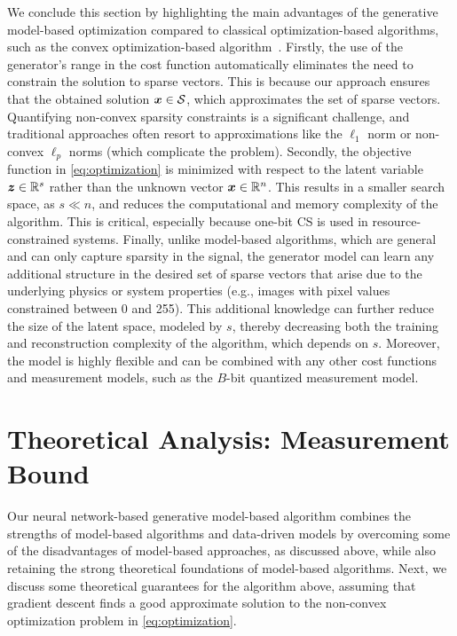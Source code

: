 \documentclass[journal]{IEEEtran}
\begin{document}
We conclude this section by highlighting the main advantages of the generative model-based optimization compared to classical optimization-based algorithms, such as the convex optimization-based algorithm~\cite{plan2012robust}. Firstly, the use of the generator's range in the cost function automatically eliminates the need to constrain the solution to sparse vectors. This is because our approach ensures that the obtained solution $\boldsymbol{x}\in\mathcal{S}$, which approximates the set of sparse vectors. Quantifying non-convex sparsity constraints is a significant challenge, and traditional approaches often resort to approximations like the $\ell_1$ norm or non-convex $\ell_p$ norms (which complicate the problem). Secondly, the objective function in \eqref{eq:optimization} is minimized with respect to the latent variable $\boldsymbol{z}\in\mathbb{R}^s$ rather than the unknown vector $\boldsymbol{x}\in\mathbb{R}^n$. This results in a smaller search space, as $s \ll n$, and reduces the computational and memory complexity of the algorithm. This is critical, especially because one-bit CS is used in resource-constrained systems. Finally, unlike model-based algorithms, which are general and can only capture sparsity in the signal, the generator model can learn any additional structure in the desired set of sparse vectors that arise due to the underlying physics or system properties (e.g., images with pixel values constrained between 0 and 255). This additional knowledge can further reduce the size of the latent space, modeled by $s$, thereby decreasing both the training and reconstruction complexity of the algorithm, which depends on $s$. Moreover, the model is highly flexible and can be combined with any other cost functions and measurement models, such as the $B$-bit quantized measurement model.

\section{Theoretical Analysis: Measurement Bound}\label{sec:theory}
Our neural network-based generative model-based algorithm combines the strengths of model-based algorithms and data-driven models by overcoming some of the disadvantages of model-based approaches, as discussed above, while also retaining the strong theoretical foundations of model-based algorithms. Next, we discuss some theoretical guarantees for the algorithm above, assuming that gradient descent finds a good approximate solution to the non-convex optimization problem in \eqref{eq:optimization}.
\end{document}
